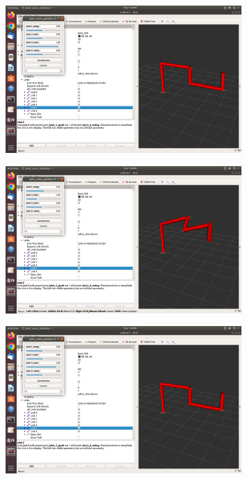 \documentclass{article} %
\begin{document}
\begin{figure}[h]
	\centering
	\includegraphics[width=0.8\textwidth]{images/ss3.png}
\end{figure}

\begin{figure}[h]
	\centering
	\includegraphics[width=0.8\textwidth]{images/ss4.png}
\end{figure}

\newpage

\begin{figure}[h]
	\centering
	\includegraphics[width=0.8\textwidth]{images/ss5.png}
\end{figure}
\end{document}
